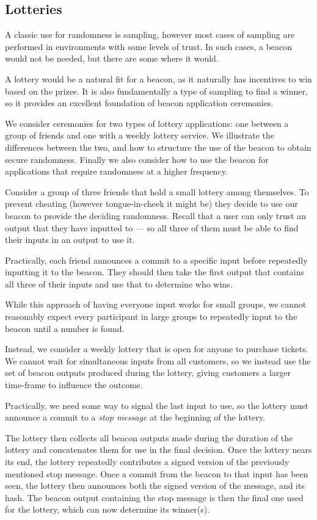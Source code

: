 
\subsection{Lotteries}
A classic use for randomness is sampling, however most cases of sampling are performed in environments with some levels of trust.
In such cases, a beacon would not be needed, but there are some where it would.

A lottery would be a natural fit for a beacon, as it naturally has incentives to win based on the prizes. It is also fundamentally a type of sampling to find a winner, so it provides an excellent foundation of beacon application ceremonies.

We consider ceremonies for two types of lottery applications: one between a group of friends and one with a weekly lottery service. We illustrate the differences between the two, and how to structure the use of the beacon to obtain secure randomness. Finally we also consider how to use the beacon for applications that require randomness at a higher frequency.

Consider a group of three friends that hold a small lottery among themselves. To prevent cheating (however tongue-in-cheek it might be) they decide to use our beacon to provide the deciding randomness. Recall that a user can only trust an output that they have inputted to --- so all three of them must be able to find their inputs in an output to use it.

Practically, each friend announces a commit to a specific input before repeatedly inputting it to the beacon. They should then take the first output that contains all three of their inputs and use that to determine who wins.

While this approach of having everyone input works for small groups, we cannot reasonably expect every participant in large groups to repeatedly input to the beacon until a number is found.

Instead, we consider a weekly lottery that is open for anyone to purchase tickets. We cannot wait for simultaneous inputs from all customers, so we instead use the set of beacon outputs produced during the lottery, giving customers a larger time-frame to influence the outcome.

Practically, we need some way to signal the last input to use, so the lottery must announce a commit to a \textit{stop message} at the beginning of the lottery.

The lottery then collects all beacon outputs made during the duration of the lottery and concatenates them for use in the final decision. Once the lottery nears its end, the lottery repeatedly contributes a signed version of the previously mentioned stop message. Once a commit from the beacon to that input has been seen, the lottery then announces both the signed version of the message, and its hash. The beacon output containing the stop message is then the final one used for the lottery, which can now determine its winner(s).


